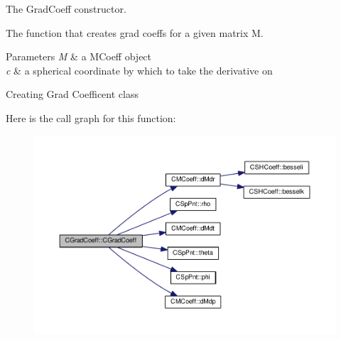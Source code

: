 The Grad\-Coeff constructor. 

The function that creates grad coeffs for a given matrix M. 
\begin{DoxyParams}{Parameters}
{\em M} & a M\-Coeff object \\
\hline
{\em c} & a spherical coordinate by which to take the derivative on\\
\hline
\end{DoxyParams}
Creating Grad Coefficent class 

Here is the call graph for this function\-:
\nopagebreak
\begin{figure}[H]
\begin{center}
\leavevmode
\includegraphics[width=350pt]{classCGradCoeff_a41d80b3998f3dfe2a9111ab9f00855fb_cgraph}
\end{center}
\end{figure}




